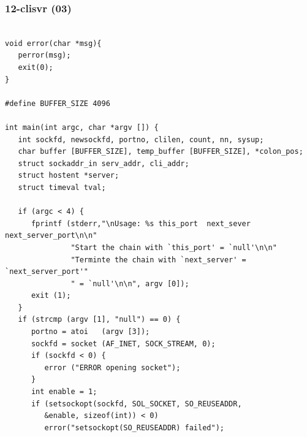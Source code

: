 \documentclass[xcolor=table, notheorems, hyperref={pdfpagelabels=false}]{beamer}
\begin{document}
\begin{frame}[fragile]
\frametitle{12-clisvr (03)}
\begin{lstlisting}[basicstyle=\ttfamily\tiny]

void error(char *msg){
   perror(msg);
   exit(0);
}

#define BUFFER_SIZE 4096

int main(int argc, char *argv []) {
   int sockfd, newsockfd, portno, clilen, count, nn, sysup;
   char buffer [BUFFER_SIZE], temp_buffer [BUFFER_SIZE], *colon_pos;
   struct sockaddr_in serv_addr, cli_addr;
   struct hostent *server;
   struct timeval tval;

   if (argc < 4) {
      fprintf (stderr,"\nUsage: %s this_port  next_sever next_server_port\n\n"
               "Start the chain with `this_port' = `null'\n\n"
               "Terminte the chain with `next_server' = `next_server_port'"
               " = `null'\n\n", argv [0]);
      exit (1);
   }
   if (strcmp (argv [1], "null") == 0) {
      portno = atoi   (argv [3]);
      sockfd = socket (AF_INET, SOCK_STREAM, 0);
      if (sockfd < 0) {
         error ("ERROR opening socket");
      }
      int enable = 1;
      if (setsockopt(sockfd, SOL_SOCKET, SO_REUSEADDR, 
         &enable, sizeof(int)) < 0)
         error("setsockopt(SO_REUSEADDR) failed");

\end{lstlisting}
\end{frame}
\end{document}
